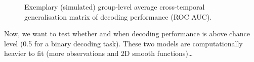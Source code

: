 \documentclass[
  doc,
  floatsintext,
  longtable,
  a4paper,
  nolmodern,
  notxfonts,
  notimes,
  colorlinks=true,linkcolor=blue,citecolor=blue,urlcolor=blue]{apa7}
\begin{document}
\begin{figure}[!htb]

\caption{\label{fig-sim-timegen}Exemplary (simulated) group-level
average cross-temporal generalisation matrix of decoding performance
(ROC AUC).}


\end{figure}%

Now, we want to test whether and when decoding performance is above
chance level (0.5 for a binary decoding task). These two models are
computationally heavier to fit (more observations and 2D smooth
functions)\ldots{}
\end{document}
